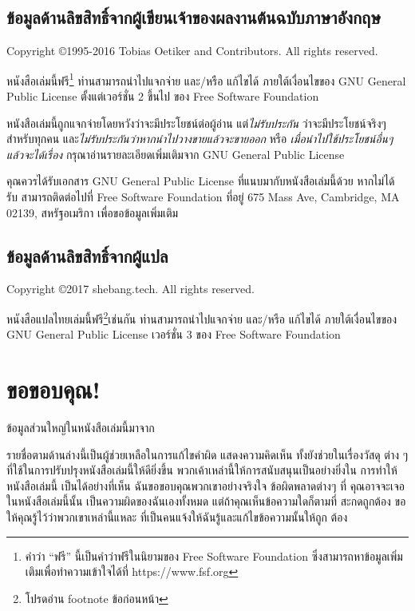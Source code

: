 
\section*{ข้อมูลด้านลิขสิทธิ์จากผู้เขียนเจ้าของผลงานต้นฉบับภาษาอังกฤษ}

Copyright \copyright 1995-2016 Tobias Oetiker and
Contributors.  All rights reserved.

หนังสือเล่มนี้ฟรี\footnote{คำว่า ``ฟรี'' นี้เป็นคำว่าฟรีในนิยามของ Free Software
Foundation ซึ่งสามารถหาข้อมูลเพิ่มเติมเพื่อทำความเข้าใจได้ที่ https://www.fsf.org}
ท่านสามารถนำไปแจกจ่าย และ/หรือ แก้ไขได้ ภายใต้เงื่อนไขของ GNU General Public
License ตั้งแต่เวอร์ชั่น 2 ขึ้นไป ของ Free Software Foundation 

หนังสือเล่มนี้ถูกแจกจ่ายโดยหวังว่าจะมีประโยชน์ต่อผู้อ่าน แต่\emph{ไม่รับประกัน}
ว่าจะมีประโยชน์จริงๆสำหรับทุกคน และ\emph{ไม่รับประกันว่าหากนำไปวางขายแล้วจะขายออก}
หรือ \emph{เมื่อนำไปใช้ประโยชน์อื่นๆแล้วจะได้เรื่อง} กรุณาอ่านรายละเอียดเพิ่มเติมจาก GNU
General Public License

คุณควรได้รับเอกสาร GNU General Public License ที่แนบมากับหนังสือเล่มนี้ด้วย หากไม่ได้
รับ สามารถติดต่อไปที่ Free Software Foundation ที่อยู่ 675 Mass Ave, Cambridge,
MA 02139, สหรัฐอเมริกา เพื่อขอข้อมูลเพิ่มเติม

\section*{ข้อมูลด้านลิขสิทธิ์จากผู้แปล}

Copyright \copyright 2017 shebang.tech.  All rights reserved.

หนังสือแปลไทยเล่มนี้ฟรี\footnote{โปรดอ่าน footnote ข้อก่อนหน้า}เช่นกัน
ท่านสามารถนำไปแจกจ่าย และ/หรือ แก้ไขได้ ภายใต้เงื่อนไขของ GNU General Public
License เวอร์ชั่น 3 ของ Free Software Foundation

\chapter{ขอขอบคุณ!}

ข้อมูลส่วนใหญ่ในหนังสือเล่มนี้มาจาก

\shbtoaddmoretranslation

รายชื่อตามด้านล่างนี้เป็นผู้ช่วยเหลือในการแก้ไขคำผิด แสดงความคิดเห็น ทั้งยังช่วยในเรื่องวัสดุ%
ต่าง ๆ ที่ใช้ในการปรับปรุงหนังสือเล่มนี้ให้ดียิ่งขึ้น พวกเค้าเหล่านี้ให้การสนับสนุนเป็นอย่างยิ่งใน%
การทำให้หนังสือเล่มนี้ เป็นได้อย่างที่เห็น ฉันขอขอบคุณพวกเขาอย่างจริงใจ ข้อผิดพลาดต่างๆ ที่%
คุณอาจจะเจอในหนังสือเล่มนี้นั้น เป็นความผิดของฉันเองทั้งหมด แต่ถ้าคุณเห็นข้อความใดก็ตามที่%
สะกดถูกต้อง ขอให้คุณรู้ไว้ว่าพวกเขาเหล่านี้แหละ ที่เป็นคนแจ้งให้ฉันรู้และแก้ไขข้อความนั้นให้ถูก%
ต้อง

\shbtoaddmoretranslation
